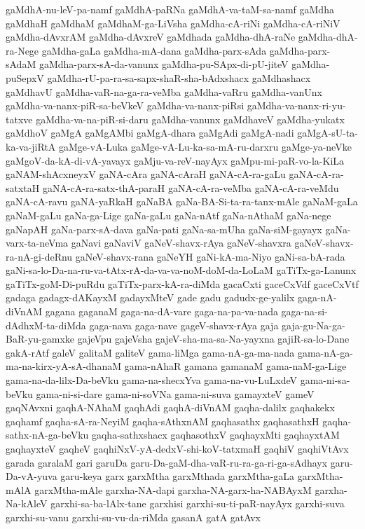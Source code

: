{gaMdhA-nu-leV-pa-namf
gaMdhA-paRNa
gaMdhA-va-taM-sa-namf
gaMdha
gaMdhaH
gaMdhaM
gaMdhaM-ga-LiVsha
gaMdha-cA-riNi
gaMdha-cA-riNiV
gaMdha-dAvxrAM
gaMdha-dAvxreV
gaMdhada
gaMdha-dhA-raNe
gaMdha-dhA-ra-Nege
gaMdha-gaLa
gaMdha-mA-dana
gaMdha-parx-sAda
gaMdha-parx-sAdaM
gaMdha-parx-sA-da-vanunx
gaMdha-pu-SApx-di-pU-jiteV
gaMdha-puSepxV
gaMdha-rU-pa-ra-sa-sapx-shaR-sha-bAdxshacx
gaMdhashacx
gaMdhavU
gaMdha-vaR-na-ga-ra-veMba
gaMdha-vaRru
gaMdha-vanUnx
gaMdha-va-nanx-piR-sa-beVkeV
gaMdha-va-nanx-piRsi
gaMdha-va-nanx-ri-yu-tatxve
gaMdha-va-na-piR-si-daru
gaMdha-vanunx
gaMdhaveV
gaMdha-yukatx
gaMdhoV
gaMgA
gaMgAMbi
gaMgA-dhara
gaMgAdi
gaMgA-nadi
gaMgA-sU-ta-ka-va-jiRtA
gaMge-vA-Luka
gaMge-vA-Lu-ka-sa-mA-ru-darxru
gaMge-ya-neVke
gaMgoV-da-kA-di-vA-yavayx
gaMju-va-reV-nayAyx
gaMpu-mi-paR-vo-la-KiLa
gaNAM-shAcxneyxV
gaNA-cAra
gaNA-cAraH
gaNA-cA-ra-gaLu
gaNA-cA-ra-satxtaH
gaNA-cA-ra-satx-thA-paraH
gaNA-cA-ra-veMba
gaNA-cA-ra-veMdu
gaNA-cA-ravu
gaNA-yaRkaH
gaNaBA
gaNa-BA-Si-ta-ra-tanx-mAle
gaNaM-gaLa
gaNaM-gaLu
gaNa-ga-Lige
gaNa-gaLu
gaNa-nAtf
gaNa-nAthaM
gaNa-nege
gaNapAH
gaNa-parx-sA-dava
gaNa-pati
gaNa-sa-mUha
gaNa-siM-gayayx
gaNa-varx-ta-neVma
gaNavi
gaNaviV
gaNeV-shavx-rAya
gaNeV-shavxra
gaNeV-shavx-ra-nA-gi-deRnu
gaNeV-shavx-rana
gaNeYH
gaNi-kA-ma-Niyo
gaNi-sa-bA-rada
gaNi-sa-lo-Da-na-ru-va-tAtx-rA-da-va-va-noM-doM-da-LoLaM
gaTiTx-ga-Lanunx
gaTiTx-goM-Di-puRdu
gaTiTx-parx-kA-ra-diMda
gacaCxti
gaceCxVdf
gaceCxVtf
gadaga
gadagx-dAKayxM
gadayxMteV
gade
gadu
gadudx-ge-yalilx
gaga-nA-diVnAM
gagana
gaganaM
gaga-na-dA-vare
gaga-na-pa-va-nada
gaga-na-si-dAdhxM-ta-diMda
gaga-nava
gaga-nave
gageV-shavx-rAya
gaja
gaja-gu-Na-ga-BaR-yu-gamxke
gajeVpu
gajeVsha
gajeV-sha-ma-sa-Na-yayxna
gajiR-sa-lo-Dane
gakA-rAtf
galeV
galitaM
galiteV
gama-liMga
gama-nA-ga-ma-nada
gama-nA-ga-ma-na-kirx-yA-sA-dhanaM
gama-nAhaR
gamana
gamanaM
gama-naM-ga-Lige
gama-na-da-lilx-Da-beVku
gama-na-shecxYva
gama-na-vu-LuLxdeV
gama-ni-sa-beVku
gama-ni-si-dare
gama-ni-soVNa
gama-ni-suva
gamayxteV
gameV
gaqNAvxni
gaqhA-NAhaM
gaqhAdi
gaqhA-diVnAM
gaqha-dalilx
gaqhakekx
gaqhamf
gaqha-sA-ra-NeyiM
gaqha-sAthxnAM
gaqhasathx
gaqhasathxH
gaqha-sathx-nA-ga-beVku
gaqha-sathxshacx
gaqhasothxV
gaqhayxMti
gaqhayxtAM
gaqhayxteV
gaqheV
gaqhiNxV-yA-dedxV-shi-koV-tatxmaH
gaqhiV
gaqhiVtAvx
garada
garalaM
gari
garuDa
garu-Da-gaM-dha-vaR-ru-ra-ga-ri-ga-sAdhayx
garu-Da-vA-yuva
garu-keya
garx
garxMtha
garxMthada
garxMtha-gaLa
garxMtha-mAlA
garxMtha-mAle
garxha-NA-dapi
garxha-NA-garx-ha-NABAyxM
garxha-Na-kAleV
garxhi-sa-ba-lAlx-tane
garxhisi
garxhi-su-ti-paR-nayAyx
garxhi-suva
garxhi-su-vanu
garxhi-su-vu-da-riMda
gasanA
gatA
gatAvx
}
